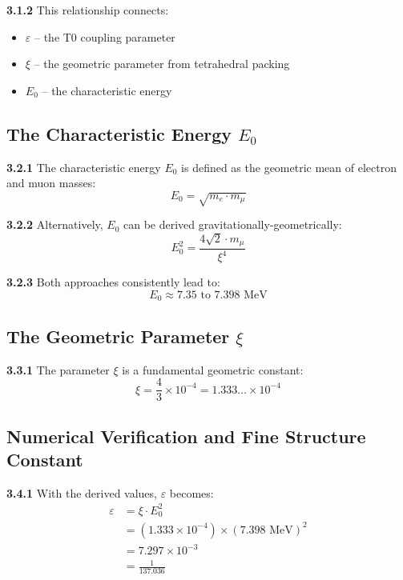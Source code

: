 \documentclass[12pt,a4paper]{article}
\newcommand{\Ezero}{E_0}
\newcommand{\xipar}{\xi}
\begin{document}
	\noindent \textbf{3.1.2} This relationship connects:
	\begin{itemize}
		\item $\varepsilon$ -- the T0 coupling parameter
		\item $\xipar$ -- the geometric parameter from tetrahedral packing
		\item $\Ezero$ -- the characteristic energy
	\end{itemize}
	
	\subsection{The Characteristic Energy $\Ezero$}
	
	\noindent \textbf{3.2.1} The characteristic energy $\Ezero$ is defined as the geometric mean of electron and muon masses:
	\begin{equation}
		\Ezero = \sqrt{m_e \cdot m_\mu}
		\label{eq:E0_geometric_mean}
	\end{equation}
	
	\noindent \textbf{3.2.2} Alternatively, $\Ezero$ can be derived gravitationally-geometrically:
	\begin{equation}
		\Ezero^2 = \frac{4\sqrt{2} \cdot m_\mu}{\xipar^4}
		\label{eq:E0_gravitational}
	\end{equation}
	
	\noindent \textbf{3.2.3} Both approaches consistently lead to:
	\begin{equation}
		\Ezero \approx 7.35 \text{ to } 7.398 \text{ MeV}
	\end{equation}
	
	\subsection{The Geometric Parameter $\xipar$}
	
	\noindent \textbf{3.3.1} The parameter $\xipar$ is a fundamental geometric constant:
	\begin{equation}
		\xipar = \frac{4}{3} \times 10^{-4} = 1.333\ldots \times 10^{-4}
		\label{eq:xi_value}
	\end{equation}
	
	\subsection{Numerical Verification and Fine Structure Constant}
	
	\noindent \textbf{3.4.1} With the derived values, $\varepsilon$ becomes:
	\begin{align}
		\varepsilon &= \xipar \cdot \Ezero^2 \\
		&= (1.333 \times 10^{-4}) \times (7.398 \text{ MeV})^2 \\
		&= 7.297 \times 10^{-3} \\
		&= \frac{1}{137.036}
		\label{eq:epsilon_numerical}
	\end{align}
	
\end{document}
